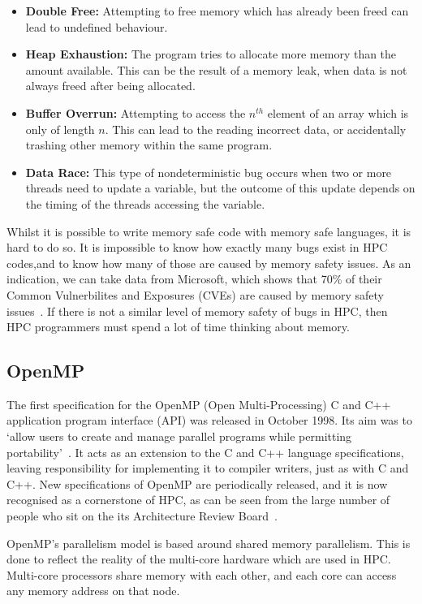 \begin{itemize}
    \item \textbf{Double Free:} Attempting to free memory which has already been freed can lead to undefined behaviour.
    \item \textbf{Heap Exhaustion:} The program tries to allocate more memory than the amount available. This can be the result of a memory leak, when data is not always freed after being allocated.
    \item \textbf{Buffer Overrun:} Attempting to access the $n^{th}$ element of an array which is only of length $n$. This can lead to the reading incorrect data, or accidentally trashing other memory within the same program.
    \item \textbf{Data Race:} This type of nondeterministic bug occurs when two or more threads need to update a variable, but the outcome of this update depends on the timing of the threads accessing the variable. 
\end{itemize}

Whilst it is possible to write memory safe code with memory safe languages, it is hard to do so. It is impossible to know how exactly many bugs exist in HPC codes,and to know how many of those are caused by memory safety issues.
As an indication, we can take data from Microsoft, which shows that 70\% of their Common Vulnerbilites and Exposures (CVEs) are caused by memory safety issues~\cite{MicroBugs}. If there is not a similar level of memory safety of bugs in HPC, then HPC programmers must spend a lot of time thinking about memory.

\subsection{OpenMP}
The first specification for the OpenMP (Open Multi-Processing) C and C++ application program interface (API) was released in October 1998. Its aim was to `allow users to create and manage parallel programs while permitting portability'~\cite{OpenMPSpec}. It acts as an extension to the C and C++ language specifications, leaving responsibility for implementing it to compiler writers, just as with C and C++. New specifications of OpenMP are periodically released, and it is now recognised as a cornerstone of HPC, as can be seen from the large number of people who sit on the its Architecture Review Board~\cite{OpenMPARB}.

OpenMP's parallelism model is based around shared memory parallelism. This is done to reflect the reality of the multi-core hardware which are used in HPC. Multi-core processors share memory with each other, and each core can access any memory address on that node.  

